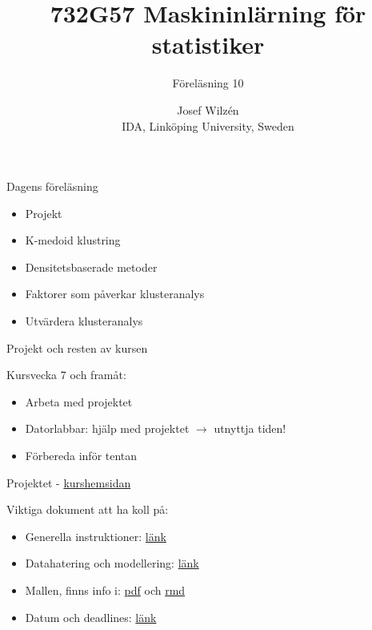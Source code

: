 \documentclass[10pt,english]{beamer}
\title{732G57 Maskininlärning för statistiker}
\subtitle{Föreläsning 10}
\date{}
\author{Josef Wilzén \\ IDA, Linköping University, Sweden}
\begin{document}
\maketitle

\begin{frame}{Dagens föreläsning}

    \begin{itemize}
        \item Projekt
        \item K-medoid klustring
        \item Densitetsbaserade metoder
        \item Faktorer som påverkar klusteranalys
        \item Utvärdera klusteranalys
    \end{itemize}
    
\end{frame}

\begin{frame}{Projekt och resten av kursen}
  
   Kursvecka 7 och framåt: 
  
  \begin{itemize}
        \item Arbeta med projektet
        \item Datorlabbar: hjälp med projektet $\rightarrow$ utnyttja tiden!
        \item Förbereda inför tentan
    \end{itemize}
    
      Projektet - \href{https://www.ida.liu.se/~732G57/info/courseinfo.sv.shtml\#projekt}{kurshemsidan}

  Viktiga dokument att ha koll på:
    \begin{itemize}
        \item Generella instruktioner: \href{https://raw.githubusercontent.com/STIMALiU/732G57_ML/refs/heads/main/project/projekt_2026.pdf}{länk}
        \item Datahatering och modellering: \href{https://raw.githubusercontent.com/STIMALiU/732G57_ML/refs/heads/main/project/Projekt\%20modellering.pdf}{länk}
        \item Mallen, finns info i: \href{https://raw.githubusercontent.com/STIMALiU/732G57_ML/refs/heads/main/project/template/Rapportmall-STIMA-projekt.pdf}{pdf} och
                                     \href{https://raw.githubusercontent.com/STIMALiU/732G57_ML/refs/heads/main/project/template/Rapportmall\%20STIMA\%20projekt.rmd}{rmd}
        \item Datum och deadlines: \href{https://raw.githubusercontent.com/STIMALiU/732G57_ML/refs/heads/main/project/Datum_ht2026.pdf}{länk}
    \end{itemize}
    

\end{frame}
\end{document}
